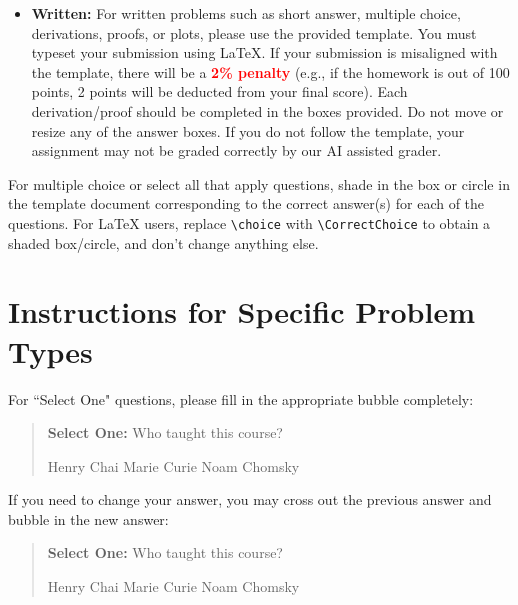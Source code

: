 \documentclass[11pt,addpoints,answers]{exam}
\newcommand{\blackcircle}{\tikz\draw[black,fill=black] (0,0) circle (1ex);}
\begin{document}
\begin{itemize}
\begin{itemize}
\item \textbf{Written:} For written problems such as short answer, multiple choice, derivations, proofs, or plots, please use the provided template. You must typeset your submission using \LaTeX{}. If your submission is misaligned with the template, there will be a \textbf{\textcolor{red}{2\% penalty}} (e.g., if the homework is out of 100 points, 2 points will be deducted from your final score). Each derivation/proof should be completed in the boxes provided. Do not move or resize any of the answer boxes. If you do not follow the template, your assignment may not be graded correctly by our AI assisted grader.

\end{itemize}

\end{itemize}


For multiple choice or select all that apply questions, shade in the box or circle in the template document corresponding to the correct answer(s) for each of the questions. For \LaTeX{} users, replace \lstinline{\choice} with \lstinline{\CorrectChoice} to obtain a shaded box/circle, and don't change anything else.\clearpage

\section*{Instructions for Specific Problem Types}

For ``Select One" questions, please fill in the appropriate bubble completely:

\begin{quote}
\textbf{Select One:} Who taught this course?
    \begin{checkboxes}
     \CorrectChoice Henry Chai
     \choice Marie Curie
     \choice Noam Chomsky
    \end{checkboxes}
\end{quote}

If you need to change your answer, you may cross out the previous answer and bubble in the new answer:

\begin{quote}
\textbf{Select One:} Who taught this course?
    {
    \begin{checkboxes}
     \CorrectChoice Henry Chai
     \choice Marie Curie \checkboxchar{\xcancel{\blackcircle}{}}
     \choice Noam Chomsky
    \end{checkboxes}
    }
\end{quote}
\end{document}
